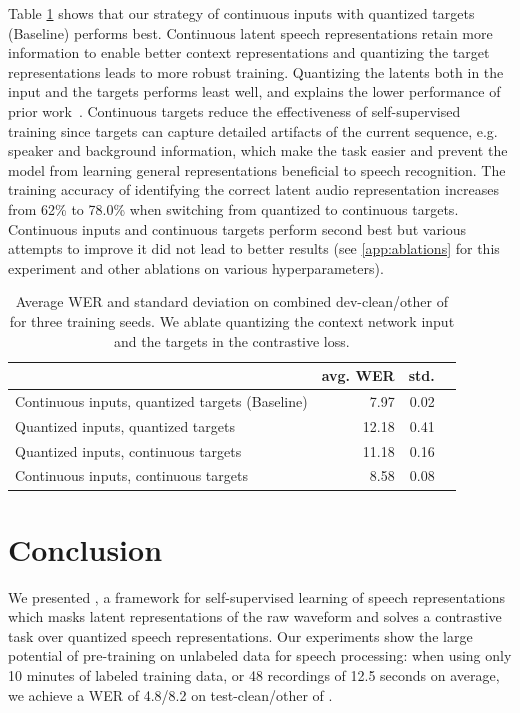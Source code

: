 \documentclass{article}
\begin{document}
Table \ref{tbl:quantization} shows that our strategy of continuous inputs with quantized targets (Baseline) performs best. 
Continuous latent speech representations retain more information to enable better context representations and quantizing the target representations leads to more robust training.
Quantizing the latents both in the input and the targets performs least well, and explains the lower performance of prior work~\citep{baevski2019vqwav2vec,baevski2019effectiveness}.
Continuous targets reduce the effectiveness of self-supervised training since targets can capture detailed artifacts of the current sequence, e.g. speaker and background information, which make the task easier and prevent the model from learning general representations beneficial to speech recognition.
The training accuracy of identifying the correct latent audio representation increases from 62\% to 78.0\% when switching from quantized to continuous targets.
Continuous inputs and continuous targets perform second best but various attempts to improve it did not lead to better results (see \autoref{app:ablations} for this experiment and other ablations on various hyperparameters).


\begin{table}[t]
\caption{%
Average WER and standard deviation on combined dev-clean/other of \libri{} for three training seeds. We ablate quantizing the context network input and the targets in the contrastive loss.
}
\label{tbl:quantization}
\centering
\begin{tabular}{lrrr}
\toprule
{} & avg. WER & std. \\
\midrule
Continuous inputs, quantized targets (Baseline) & 7.97 & 0.02  \\
Quantized inputs, quantized targets & 12.18 & 0.41 \\
Quantized inputs, continuous targets & 11.18 & 0.16 \\
Continuous inputs, continuous targets & 8.58 & 0.08 \\
\bottomrule
\end{tabular}
\end{table}

\section{Conclusion}

We presented \wvpp{}, a framework for self-supervised learning of speech representations which masks latent representations of the raw waveform and solves a contrastive task over quantized speech representations.
Our experiments show the large potential of pre-training on unlabeled data for speech processing: 
when using only 10 minutes of labeled training data, or 48 recordings of 12.5 seconds on average, we achieve a WER of 4.8/8.2 on test-clean/other of \libri{}. 
\end{document}

